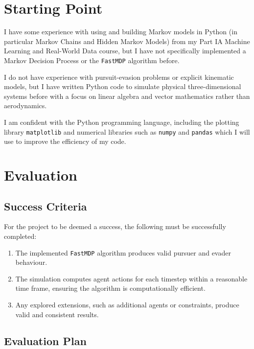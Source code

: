 \begin{refsection}
  \newpage


  \section{Starting Point}

  I have some experience with using and building Markov models in Python (in particular Markov Chains and Hidden Markov Models) from my Part IA Machine Learning and Real-World Data course, but I have not specifically implemented a Markov Decision Process or the \texttt{FastMDP} algorithm before.

  I do not have experience with pursuit-evasion problems or explicit kinematic models, but I have written Python code to simulate physical three-dimensional systems before with a focus on linear algebra and vector mathematics rather than aerodynamics.

  I am confident with the Python programming language, including the plotting library \texttt{matplotlib} and numerical libraries such as \texttt{numpy} and \texttt{pandas} which I will use to improve the efficiency of my code.

  \section{Evaluation}

  \subsection{Success Criteria}

  For the project to be deemed a success, the following must be successfully completed:

  \begin{enumerate}
    \item The implemented \texttt{FastMDP} algorithm produces valid pursuer and evader behaviour. 
    \item The simulation computes agent actions for each timestep within a reasonable time frame, ensuring the algorithm is computationally efficient.
    \item Any explored extensions, such as additional agents or constraints, produce valid and consistent results.
  \end{enumerate}

  \subsection{Evaluation Plan}


\end{refsection}

